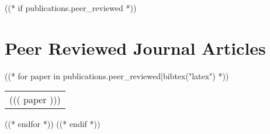 \documentclass[a4paper, oneside, final]{scrartcl} %
\begin{document}
\begin{center}

((* if publications.peer_reviewed *))
\section{Peer Reviewed Journal Articles}

((* for paper in publications.peer_reviewed|bibtex("latex") *))
\begin{tabularx}{0.97\linewidth}{X}
((( paper )))
\end{tabularx}

\vspace{6pt}
((* endfor *))
((* endif *))


\end{center}
\end{document}
